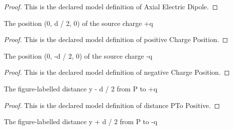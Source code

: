 \begin{proof}
  This is the declared model definition of Axial Electric Dipole.
\end{proof}
\begin{definition}
  \label{def:physics:phyx-mini-0997:phyxminiproblems-problemphyxmini0997-positivechargeposition}
  The position (0, d / 2, 0) of the source charge +q
\end{definition}
\begin{proof}
  This is the declared model definition of positive Charge Position.
\end{proof}
\begin{definition}
  \label{def:physics:phyx-mini-0997:phyxminiproblems-problemphyxmini0997-negativechargeposition}
  The position (0, -d / 2, 0) of the source charge -q
\end{definition}
\begin{proof}
  This is the declared model definition of negative Charge Position.
\end{proof}
\begin{definition}
  \label{def:physics:phyx-mini-0997:phyxminiproblems-problemphyxmini0997-distanceptopositive}
  The figure-labelled distance y - d / 2 from P to +q
\end{definition}
\begin{proof}
  This is the declared model definition of distance PTo Positive.
\end{proof}
\begin{definition}
  \label{def:physics:phyx-mini-0997:phyxminiproblems-problemphyxmini0997-distanceptonegative}
  The figure-labelled distance y + d / 2 from P to -q
\end{definition}

